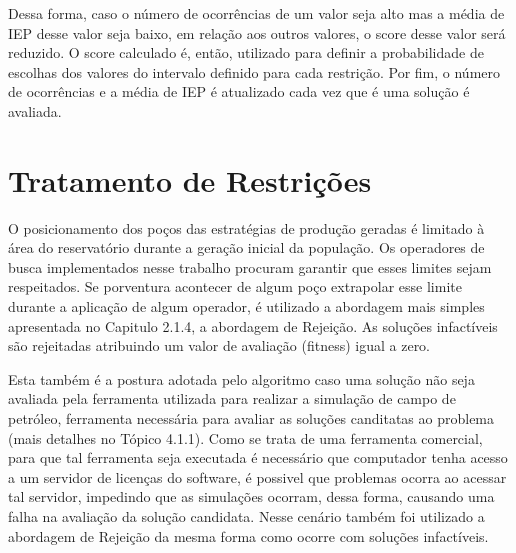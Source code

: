 Dessa forma, caso o número de ocorrências de um valor seja alto mas a média de IEP desse valor seja baixo, em relação aos outros valores, o score desse valor será reduzido. O score calculado é, então, utilizado para definir a probabilidade de escolhas dos valores do intervalo definido para cada restrição. Por fim, o número de ocorrências e a média de IEP é atualizado cada vez que é uma solução é avaliada.

\section{Tratamento de Restrições}
\label{ch:3_TratamentoRestricoes}
O posicionamento dos poços das estratégias de produção geradas é limitado à área do reservatório durante a geração inicial da população. Os operadores de busca implementados nesse trabalho procuram garantir que esses limites sejam respeitados. Se porventura acontecer de algum poço extrapolar esse limite durante a aplicação de algum operador, é utilizado a abordagem mais simples apresentada no Capitulo 2.1.4, a abordagem de Rejeição. As soluções infactíveis são rejeitadas atribuindo um valor de avaliação (fitness) igual a zero.

 
Esta também é a postura adotada pelo algoritmo caso uma solução não seja avaliada pela ferramenta utilizada para realizar a simulação de campo de petróleo, ferramenta necessária para avaliar as soluções canditatas ao problema (mais detalhes no Tópico 4.1.1). Como se trata de uma ferramenta comercial, para que tal ferramenta seja executada é necessário que computador tenha acesso a um servidor de licenças do software, é possivel que problemas ocorra ao acessar tal servidor, impedindo que as simulações ocorram, dessa forma, causando uma falha na avaliação da solução candidata. Nesse cenário também foi utilizado a abordagem de Rejeição da mesma forma como ocorre com soluções infactíveis.